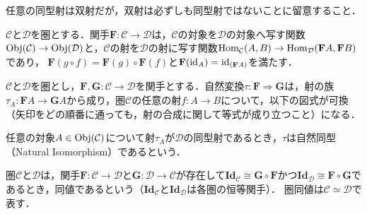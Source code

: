 \documentclass[type_judgement.tex]{subfiles}
\begin{document}
\begin{defn}[Category（圏）]
任意の同型射は双射だが，双射は必ずしも同型射ではないことに留意すること．

\begin{defn}[Functor（関手）]
$\mathcal{C}$と$\mathcal{D}$を圏とする．関手$\mathbf{F}:\mathcal{C} \rightarrow \mathcal{D}$は，$\mathcal{C}$の対象を$\mathcal{D}$の対象へ写す関数$\mathop{\mathrm{Obj}}\nolimits(\mathcal{C}) \rightarrow \mathop{\mathrm{Obj}}\nolimits(\mathcal{D})$と，$\mathcal{C}$の射を$\mathcal{D}$の射に写す関数$\mathop{\mathrm{Hom}}\nolimits_\mathcal{C}(A,B) \rightarrow \mathop{\mathrm{Hom}}\nolimits_\mathcal{D}(\mathbf{F}A,\mathbf{F}B)$であり，
$\mathbf{F}(g \circ f) = \mathbf{F}(g) \circ \mathbf{F}(f)$と$\mathbf{F}(\mathop{\mathrm{id}}\nolimits_A) = \mathop{\mathrm{id}}\nolimits_{(\mathbf{F}A)}$を満たす．
\end{defn}



\begin{defn}
$\mathcal{C}$と$\mathcal{D}$を圏とし，$\mathbf{F},\mathbf{G}:\mathcal{C} \rightarrow \mathcal{D}$を関手とする．自然変換$\tau:\mathbf{F} \Rightarrow \mathbf{G}$は，射の族$\tau_A:\mathbf{F}A \rightarrow \mathbf{G}A$から成り，圏$\mathcal{C}$の任意の射$f:A \rightarrow B$について，以下の図式が可換（矢印をどの順番に通っても，射の合成に関して等式が成り立つこと）になる．
\begin{center}
\end{center}
任意の対象$A\in\mathop{\mathrm{Obj}}\nolimits(\mathcal{C})$について射$\tau_A$が$\mathcal{D}$の同型射であるとき，$\tau$は自然同型（Natural Isomorphism）であるという．
\end{defn}

\begin{defn}
圏$\mathcal{C}$と$\mathcal{D}$は，関手$\mathbf{F}:\mathcal{C} \rightarrow \mathcal{D}$と$\mathbf{G}:\mathcal{D} \rightarrow \mathcal{C}$が存在して$\mathbf{Id}_\mathcal{C} \cong \mathbf{G}\circ\mathbf{F}$かつ$\mathbf{Id}_\mathcal{D} \cong \mathbf{F}\circ\mathbf{G}$であるとき，同値であるという（$\mathbf{Id}_\mathcal{C}$と$\mathbf{Id}_\mathcal{D}$は各圏の恒等関手）．
圏同値は$\mathcal{C} \simeq \mathcal{D}$で表す．
\end{defn}


\end{defn}
\end{document}
